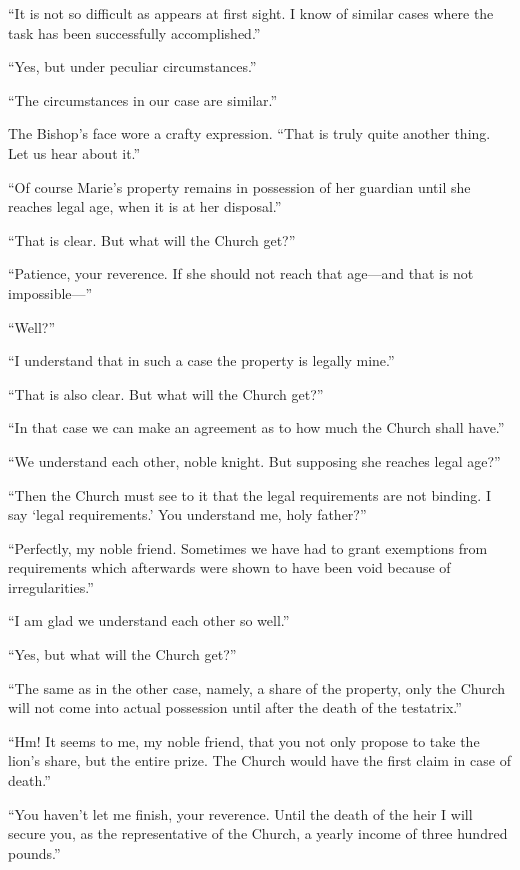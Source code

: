 ``It is not so difficult as appears at first sight. I know of similar
cases where the task has been successfully accomplished.''

``Yes, but under peculiar circumstances.''

``The circumstances in our case are similar.''

The Bishop's face wore a crafty expression. ``That is truly quite
another thing. Let us hear about it.''

``Of course Marie's property remains in possession of her guardian until
she reaches legal age, when it is at her disposal.''

``That is clear. But what will the Church get?''

``Patience, your reverence. If she should not reach that age---and that
is not impossible---''

``Well?''

``I understand that in such a case the property is legally mine.''

``That is also clear. But what will the Church get?''

``In that case we can make an agreement as to how much the Church shall
have.''

``We understand each other, noble knight. But supposing she reaches
legal age?''

``Then the Church must see to it that the legal requirements are not
binding. I say `legal requirements.' You understand me, holy father?''

``Perfectly, my noble friend. Sometimes we have had to grant exemptions
from requirements which afterwards were shown to have been void because
of irregularities.''

``I am glad we understand each other so well.''

``Yes, but what will the Church get?''

``The same as in the other case, namely, a share of the property, only
the Church will not come into actual possession until after the death of
the testatrix.''

``Hm! It seems to me, my noble friend, that you not only propose to take
the lion's share, but the entire prize. The Church would have the first
claim in case of death.''

``You haven't let me finish, your reverence. Until the death of the heir
I will secure you, as the representative of the Church, a yearly income
of three hundred pounds.''
